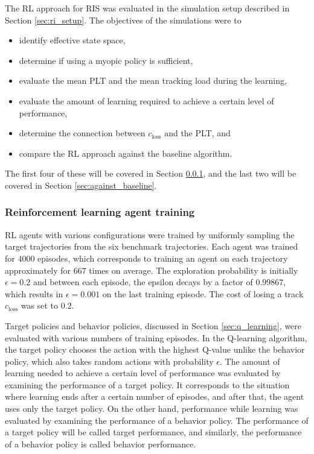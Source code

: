 \documentclass[english, 12pt, a4paper, elec, utf8, a-1b, online]{aaltothesis}
\numberwithin{equation}{section}
\newcommand{\closs}{c_\text{loss}}
\begin{document}
The RL approach for RIS was evaluated in the simulation setup described in Section \ref{sec:ri_setup}.
The objectives of the simulations were to
\begin{itemize}
    \item identify effective state space,
    \item determine if using a myopic policy is sufficient,
    \item evaluate the mean PLT and the mean tracking load during the learning,
    \item evaluate the amount of learning required to achieve a certain level of performance,
    \item determine the connection between $\closs$ and the PLT, and
    \item compare the RL approach against the baseline algorithm.
\end{itemize}
The first four of these will be covered in Section \ref{sec:training}, and the last two will be covered in Section \ref{sec:against_baseline}.

\subsubsection{Reinforcement learning agent training}\label{sec:training}

RL agents with various configurations were trained by uniformly sampling the target trajectories from the six benchmark trajectories.
Each agent was trained for $4000$ episodes, which corresponds to training an agent on each trajectory approximately for $667$ times on average.
The exploration probability is initially $\epsilon=0.2$ and between each episode, the epsilon decays by a factor of $0.99867$, which results in $\epsilon=0.001$ on the last training episode.
The cost of losing a track $\closs$ was set to $0.2$.

Target policies and behavior policies, discussed in Section \ref{sec:q_learning}, were evaluated with various numbers of training episodes.
In the Q-learning algorithm, the target policy chooses the action with the highest Q-value unlike the behavior policy, which also takes random actions with probability $\epsilon$.
The amount of learning needed to achieve a certain level of performance was evaluated by examining the performance of a target policy.
It corresponds to the situation where learning ends after a certain number of episodes, and after that, the agent uses only the target policy.
On the other hand, performance while learning was evaluated by examining the performance of a behavior policy.
The performance of a target policy will be called target performance, and similarly, the performance of a behavior policy is called behavior performance.
\end{document}
